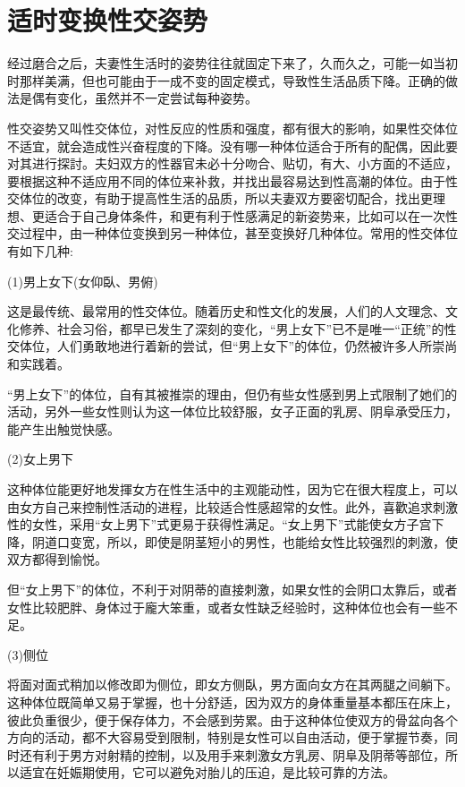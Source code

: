 \documentclass[12pt,UTF8]{ctexbook}
\begin{document}
\section{适时变换性交姿势}

经过磨合之后，夫妻性生活时的姿势往往就固定下来了，久而久之，可能一如当初时那样美满，但也可能由于一成不变的固定模式，导致性生活品质下降。正确的做法是偶有变化，虽然并不一定尝试每种姿势。

性交姿势又叫性交体位，对性反应的性质和强度，都有很大的影响，如果性交体位不适宜，就会造成性兴奋程度的下降。没有哪一种体位适合于所有的配偶，因此要对其进行探討。夫妇双方的性器官未必十分吻合、贴切，有大、小方面的不适应，要根据这种不适应用不同的体位来补救，并找出最容易达到性高潮的体位。由于性交体位的改变，有助于提高性生活的品质，所以夫妻双方要密切配合，找出更理想、更适合于自己身体条件，和更有利于性感满足的新姿势来，比如可以在一次性交过程中，由一种体位变换到另一种体位，甚至变换好几种体位。常用的性交体位有如下几种:

(1)男上女下(女仰臥、男俯)

这是最传统、最常用的性交体位。随着历史和性文化的发展，人们的人文理念、文化修养、社会习俗，都早已发生了深刻的变化，“男上女下”已不是唯一“正统”的性交体位，人们勇敢地进行着新的尝试，但“男上女下”的体位，仍然被许多人所崇尚和实践着。

“男上女下”的体位，自有其被推崇的理由，但仍有些女性感到男上式限制了她们的活动，另外一些女性则认为这一体位比较舒服，女子正面的乳房、阴阜承受压力，能产生出触觉快感。

(2)女上男下

这种体位能更好地发揮女方在性生活中的主观能动性，因为它在很大程度上，可以由女方自己来控制性活动的进程，比较适合性感超常的女性。此外，喜歡追求刺激性的女性，采用“女上男下”式更易于获得性满足。“女上男下”式能使女方子宫下降，阴道口变宽，所以，即使是阴茎短小的男性，也能给女性比较强烈的刺激，使双方都得到愉悦。

但“女上男下”的体位，不利于对阴蒂的直接刺激，如果女性的会阴口太靠后，或者女性比较肥胖、身体过于龐大笨重，或者女性缺乏经验时，这种体位也会有一些不足。

(3)侧位

将面对面式稍加以修改即为侧位，即女方侧臥，男方面向女方在其两腿之间躺下。这种体位既简单又易于掌握，也十分舒适，因为双方的身体重量基本都压在床上，彼此负重很少，便于保存体力，不会感到劳累。由于这种体位使双方的骨盆向各个方向的活动，都不大容易受到限制，特别是女性可以自由活动，便于掌握节奏，同时还有利于男方对射精的控制，以及用手来刺激女方乳房、阴阜及阴蒂等部位，所以适宜在妊娠期使用，它可以避免对胎儿的压迫，是比较可靠的方法。
\end{document}
